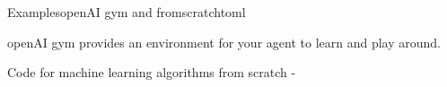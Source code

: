 \documentclass[10pt]{beamer}
\begin{document}
\begin{frame}{Examples}{openAI gym and fromscratchtoml}

\item openAI gym provides an environment for your agent to learn and play around. \href{https://gym.openai.com/envs/#classic_control}{}

\item Code for machine learning algorithms from scratch -  \href{https://github.com/markroxor/fromscratchtoml}{}

\end{frame}


{\1
\begin{frame}
\end{frame}}
\end{document}
